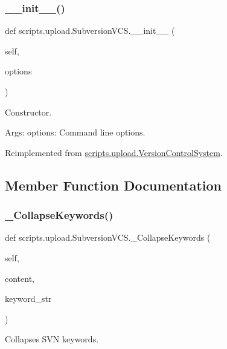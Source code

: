 \subsubsection{\texorpdfstring{\_\_init\_\_()}{\_\_init\_\_()}}
{\footnotesize\ttfamily def scripts.\+upload.\+Subversion\+V\+C\+S.\+\_\+\+\_\+init\+\_\+\+\_\+ (\begin{DoxyParamCaption}\item[{}]{self,  }\item[{}]{options }\end{DoxyParamCaption})}

\begin{DoxyVerb}Constructor.

Args:
  options: Command line options.
\end{DoxyVerb}
 

Reimplemented from \mbox{\hyperlink{classscripts_1_1upload_1_1_version_control_system_af9abfef93ba0921f6c63b51309c8d711}{scripts.\+upload.\+Version\+Control\+System}}.



\subsection{Member Function Documentation}
\mbox{\label{classscripts_1_1upload_1_1_subversion_v_c_s_a4957ed2e8216eac6a6478c250c3f2024}} 
\subsubsection{\texorpdfstring{\_CollapseKeywords()}{\_CollapseKeywords()}}
{\footnotesize\ttfamily def scripts.\+upload.\+Subversion\+V\+C\+S.\+\_\+\+Collapse\+Keywords (\begin{DoxyParamCaption}\item[{}]{self,  }\item[{}]{content,  }\item[{}]{keyword\+\_\+str }\end{DoxyParamCaption})\hspace{0.3cm}{\ttfamily [private]}}

\begin{DoxyVerb}Collapses SVN keywords.\end{DoxyVerb}
 \mbox{\label{classscripts_1_1upload_1_1_subversion_v_c_s_aa5ae58b4becdf9ba9fb0a6a9e374baae}} 
